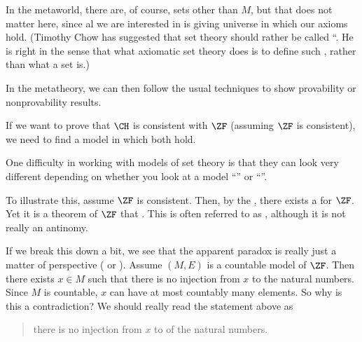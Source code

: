 \documentclass[letterpaper,10pt,english]{jupyterBook}
\begin{document}
\sphinxAtStartPar
In the meta\sphinxhyphen{}world, there are, of course, sets other than \(M\), but that does not matter here, since al we are interested in is giving  universe in which our axioms hold. (Timothy Chow has suggested that set theory should rather be called “. He is right in the sense that what axiomatic set theory does is to define such , rather than what a set is.)

\sphinxAtStartPar
In the meta\sphinxhyphen{}theory, we can then follow the usual techniques to show provability or non\sphinxhyphen{}provability results.

\sphinxAtStartPar
If we want to prove that \(\CH\) is consistent with \(\ZF\) (assuming \(\ZF\) is consistent), we need to find a model in which both hold.

\sphinxAtStartPar
One difficulty in working with models of set theory is that they can look very different depending on whether you look at a model “” or “”.

\sphinxAtStartPar
To illustrate this, assume \(\ZF\) is consistent. Then, by the , there exists a  for \(\ZF\).
Yet it is a theorem of \(\ZF\) that . This is often referred to as , although it is not really an antinomy.

\sphinxAtStartPar
If we break this down a bit, we see that the apparent paradox is really just a matter of perspective ( or ). Assume \((M,E)\) is a countable model of \(\ZF\). Then there exists \(x \in M\) such that there is no injection from \(x\) to the natural numbers. Since \(M\) is countable, \(x\) can have at most countably many elements. So why is this  a contradiction? We should really read the statement above as
\begin{quote}

\sphinxAtStartPar
there is no injection  from \(x\) to  of the natural numbers.
\end{quote}
\end{document}

